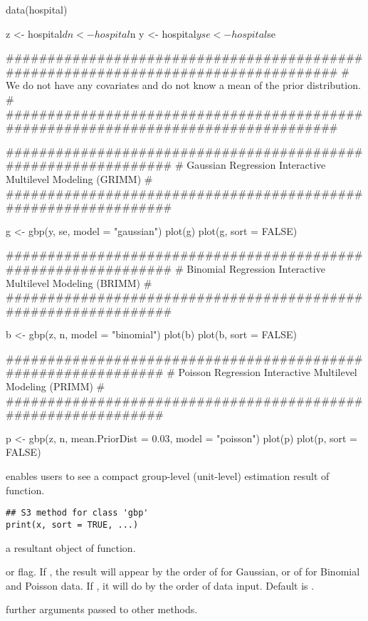 \documentclass[a4paper]{book}
\begin{document}
\begin{Examples}
\begin{ExampleCode}

  data(hospital)

  z <- hospital$d
  n <- hospital$n
  y <- hospital$y
  se <- hospital$se
  
  
  ###################################################################################
  # We do not have any covariates and do not know a mean of the prior distribution. #
  ###################################################################################

    ###############################################################
    # Gaussian Regression Interactive Multilevel Modeling (GRIMM) #
    ###############################################################

    g <- gbp(y, se, model = "gaussian")
    plot(g)
    plot(g, sort = FALSE)

    ###############################################################
    # Binomial Regression Interactive Multilevel Modeling (BRIMM) #
    ###############################################################

    b <- gbp(z, n, model = "binomial")
    plot(b)
    plot(b, sort = FALSE)

    ##############################################################
    # Poisson Regression Interactive Multilevel Modeling (PRIMM) #
    ##############################################################

    p <- gbp(z, n, mean.PriorDist = 0.03, model = "poisson")
    plot(p)
    plot(p, sort = FALSE)

\end{ExampleCode}
\end{Examples}
%
\begin{Description}\relax
{} enables users to see a compact group-level (unit-level) estimation result of  function.
\end{Description}
%
\begin{Usage}
\begin{verbatim}
## S3 method for class 'gbp'
print(x, sort = TRUE, ...)
\end{verbatim}
\end{Usage}
%
\begin{Arguments}
\begin{ldescription}
\item[\code{x}] 
a resultant object of  function. 

\item[\code{sort}] 
 or  flag. If , the result will appear by the order of  for Gaussian, or of  for Binomial and Poisson data. If , it will do by the order of data input. Default is .

\item[\code{...}] 
further arguments passed to other methods.

\end{ldescription}
\end{Arguments}
\end{document}
